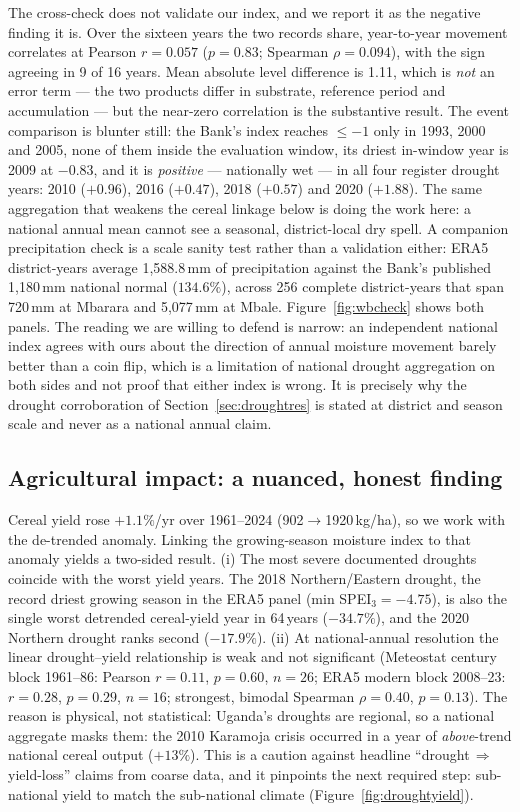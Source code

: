 \documentclass[preprint,12pt]{elsarticle}
\begin{document}
The cross-check does not validate our index, and we report it as the negative
finding it is. Over the sixteen years the two records share, year-to-year
movement correlates at Pearson $r=0.057$ ($p=0.83$; Spearman $\rho=0.094$), with
the sign agreeing in 9 of 16 years. Mean absolute level difference is 1.11, which
is \emph{not} an error term --- the two products differ in substrate, reference
period and accumulation --- but the near-zero correlation is the substantive
result. The event comparison is blunter still: the Bank's index reaches
$\leq-1$ only in 1993, 2000 and 2005, none of them inside the evaluation window,
its driest in-window year is 2009 at $-0.83$, and it is \emph{positive} ---
nationally wet --- in all four register drought years: 2010 ($+0.96$), 2016
($+0.47$), 2018 ($+0.57$) and 2020 ($+1.88$). The same aggregation that weakens
the cereal linkage below is doing the work here: a national annual mean cannot
see a seasonal, district-local dry spell. A companion precipitation check is a
scale sanity test rather than a validation either: ERA5 district-years average
1{,}588.8\,mm of precipitation against the Bank's published 1{,}180\,mm national
normal ($134.6\%$), across 256 complete district-years that span 720\,mm at
Mbarara and 5{,}077\,mm at Mbale. Figure~\ref{fig:wbcheck} shows both panels.
The reading we are willing to defend is narrow: an independent national index
agrees with ours about the direction of annual moisture movement barely better
than a coin flip, which is a limitation of national drought aggregation on both
sides and not proof that either index is wrong. It is precisely why the drought
corroboration of Section~\ref{sec:droughtres} is stated at district and season
scale and never as a national annual claim.

\subsection{Agricultural impact: a nuanced, honest finding}
\label{sec:agrires}
Cereal yield rose $+1.1\%$/yr over 1961--2024 (902$\rightarrow$1920\,kg/ha),
so we work with the de-trended anomaly. Linking the growing-season moisture
index to that anomaly yields a two-sided result.
(i) The most severe documented droughts coincide with the worst yield
years. The 2018 Northern/Eastern drought, the record driest growing season
in the ERA5 panel (min SPEI$_3=-4.75$), is also the single worst detrended
cereal-yield year in 64\,years ($-34.7\%$), and the 2020 Northern drought ranks
second ($-17.9\%$). (ii) At national-annual resolution the linear
drought--yield relationship is weak and not significant (Meteostat century
block 1961--86: Pearson $r=0.11$, $p=0.60$, $n=26$; ERA5 modern block
2008--23: $r=0.28$, $p=0.29$, $n=16$; strongest, bimodal Spearman $\rho=0.40$,
$p=0.13$). The reason is physical, not statistical: Uganda's droughts are
regional, so a national aggregate masks them: the 2010 Karamoja crisis
occurred in a year of \emph{above}-trend national cereal output
($+13\%$). This is a caution against headline
``drought\,$\Rightarrow$\,yield-loss'' claims from coarse data, and it pinpoints
the next required step: sub-national yield to match the sub-national climate
(Figure~\ref{fig:droughtyield}).
\end{document}
